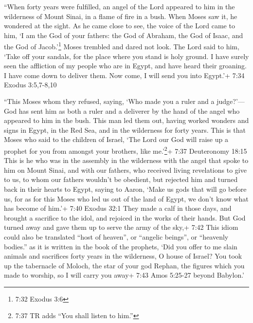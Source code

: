  ``When forty years were fulfilled, an angel of the Lord
appeared to him in the wilderness of Mount Sinai, in a flame of fire in
a bush.  When Moses saw it, he wondered at the sight. As he
came close to see, the voice of the Lord came to him,  `I
am the God of your fathers: the God of Abraham, the God of Isaac, and
the God of Jacob.'\footnote{7:32 Exodus 3:6} Moses trembled and dared
not look.  The Lord said to him, `Take off your sandals,
for the place where you stand is holy ground.  I have
surely seen the affliction of my people who are in Egypt, and have heard
their groaning. I have come down to deliver them. Now come, I will send
you into Egypt.'+ 7:34 Exodus 3:5,7-8,10

 ``This Moses whom they refused, saying, `Who made you a
ruler and a judge?'---God has sent him as both a ruler and a deliverer
by the hand of the angel who appeared to him in the bush. 
This man led them out, having worked wonders and signs in Egypt, in the
Red Sea, and in the wilderness for forty years.  This is
that Moses who said to the children of Israel, `The Lord our God will
raise up a prophet for you from amongst your brothers, like
me.'\footnote{7:37 TR adds ``You shall listen to him.''}+ 7:37
Deuteronomy 18:15  This is he who was in the assembly in
the wilderness with the angel that spoke to him on Mount Sinai, and with
our fathers, who received living revelations to give to us,
 to whom our fathers wouldn't be obedient, but rejected him
and turned back in their hearts to Egypt,  saying to Aaron,
`Make us gods that will go before us, for as for this Moses who led us
out of the land of Egypt, we don't know what has become of him.'+ 7:40
Exodus 32:1  They made a calf in those days, and brought a
sacrifice to the idol, and rejoiced in the works of their hands.
 But God turned away and gave them up to serve the army of
the sky,+ 7:42 This idiom could also be translated ``host of heaven'',
or ``angelic beings'', or ``heavenly bodies.'' as it is written in the
book of the prophets, `Did you offer to me slain animals and sacrifices
forty years in the wilderness, O house of Israel?  You took
up the tabernacle of Moloch, the star of your god Rephan, the figures
which you made to worship, so I will carry you away+ 7:43 Amos 5:25-27
beyond Babylon.'

